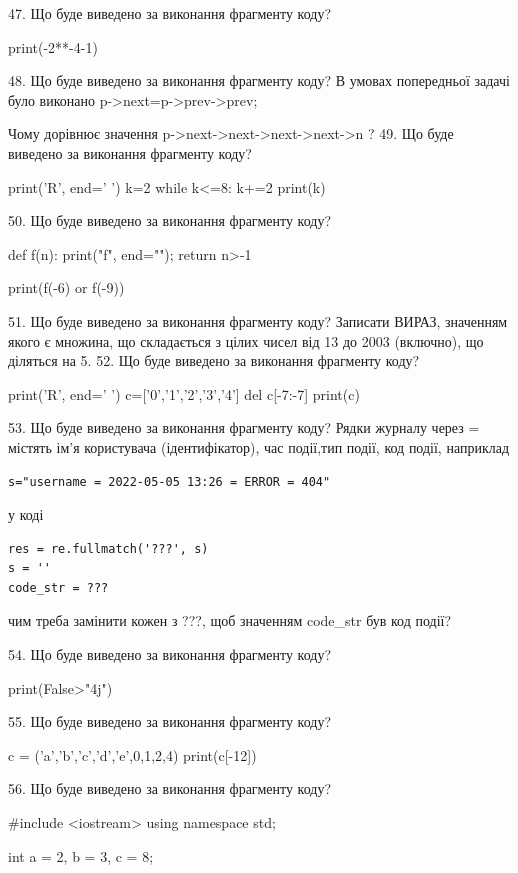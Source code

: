 \documentclass[11pt]{article}
\begin{document}
47. Що буде виведено за виконання фрагменту коду?

print(-2**-4-1)

48. Що буде виведено за виконання фрагменту коду?
В умовах попередньої задачі було виконано p->next=p->prev->prev;

Чому дорівнює значення p->next->next->next->next->n ?
49. Що буде виведено за виконання фрагменту коду?

print('R', end=' ')
k=2
while k<=8:
    k+=2
print(k)


50. Що буде виведено за виконання фрагменту коду?

def f(n):
    print("f", end="");
    return n>-1

print(f(-6) or f(-9))

51. Що буде виведено за виконання фрагменту коду?
Записати ВИРАЗ, значенням якого є множина, що складається з цілих чисел від 13 до 2003 (включно), що діляться на 5.
52. Що буде виведено за виконання фрагменту коду?

print('R', end=' ')
c=['0','1','2','3','4']
del c[-7:-7]
print(c)


53. Що буде виведено за виконання фрагменту коду?
Рядки журналу через = містять ім'я користувача (ідентифікатор), час події,тип події, код події, наприклад
\begin{verbatim}
s="username = 2022-05-05 13:26 = ERROR = 404"
\end{verbatim}
у коді 
\begin{verbatim}
res = re.fullmatch('???', s) 
s = ''
code_str = ??? 
\end{verbatim}
чим треба замінити кожен з ???, щоб значенням code\_str був код події? 



54. Що буде виведено за виконання фрагменту коду?

print(False>"4j")

55. Що буде виведено за виконання фрагменту коду?

c = ('a','b','c','d','e',0,1,2,4)
print(c[-12])


56. Що буде виведено за виконання фрагменту коду?

#include <iostream>
using namespace std;

int a = 2, b = 3, c = 8;
\end{document}
